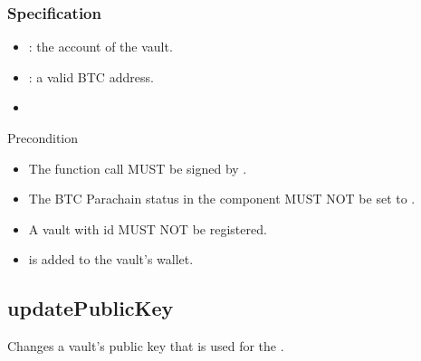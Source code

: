 \documentclass[a4paper,10pt,english]{sphinxmanual}
\begin{document}
\subsubsection{Specification}
\label{\detokenize{spec/vault-registry:id6}}


\begin{itemize}
\item {} 
: the account of the vault.

\item {} 
: a valid BTC address.

\end{itemize}

\begin{itemize}
\item {} 

\end{itemize}

Precondition
\begin{itemize}
\item {} 
The function call MUST be signed by .

\item {} 
The BTC Parachain status in the {\hyperref[\detokenize{spec/security:security}]{}} component MUST NOT be set to .

\item {} 
A vault with id  MUST NOT be registered.

\end{itemize}

\begin{itemize}
\item {} 
 is added to the vault’s wallet.

\end{itemize}


\subsection{updatePublicKey}
\label{\detokenize{spec/vault-registry:updatepublickey}}\label{\detokenize{spec/vault-registry:id7}}
Changes a vault’s public key that is used for the {\hyperref[\detokenize{security_performance/security-analysis:okd}]{}}.
\end{document}
